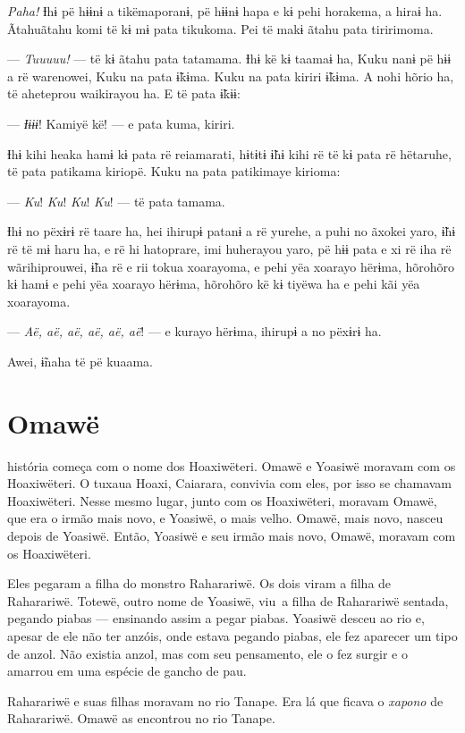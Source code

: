 \textit{Paha!} Ɨhɨ pë hɨɨnɨ a tikëmaporanɨ, pë hɨɨnɨ hapa e kɨ pehi horakema, a
 hiraɨ ha. Ãtahuãtahu komi të kɨ mɨ pata tikukoma. Pei të makɨ ãtahu pata
 tiririmoma.

--- \textit{Tuuuuu!} --- të kɨ ãtahu pata tatamama. Ɨhɨ kë kɨ taamaɨ ha, Kuku nanɨ
pë hɨɨ a rë warenowei, Kuku na pata ɨ̃kɨma. Kuku na pata kiriri ɨ̃kɨma. A nohi hõrio ha, të aheteprou waikirayou ha. E të pata ɨ̃kɨɨ:

--- \textit{Ɨɨɨɨ}! Kamiyë kë! --- e pata kuma, kiriri. 

Ɨhɨ kihi heaka hamɨ kɨ pata rë reiamarati, hɨtɨtɨ ɨ̃hɨ kihi rë të kɨ pata
rë hëtaruhe, të pata patikama kiriopë. Kuku na pata patikimaye kirioma:

--- \textit{Ku}! \textit{Ku}! \textit{Ku}! \textit{Ku}! --- të pata tamama. 

Ɨhɨ no pëxɨrɨ rë taare ha, hei ihirupɨ patanɨ a rë yurehe, a puhi no
 ãxokei yaro, ɨ̃hɨ rë të mɨ haru ha, e rë hi hatoprare, imi huherayou
 yaro, pë hɨɨ pata e xi rë iha rë wãrihiprouwei, ɨ̃ha rë e rii tokua
 xoarayoma, e pehi yëa xoarayo hërɨma, hõrohõro kɨ hamɨ e pehi yëa
 xoarayo hërɨma, hõrohõro kë kɨ tiyëwa ha e pehi kãi yëa xoarayoma. 

--- \textit{Aë, aë, aë, aë, aë, aë}! --- e kurayo hërɨma, ihirupɨ a no pëxɨrɨ ha. 

Awei, ɨ̃naha të pë kuaama. 

\chapter{Omawë}

 história começa com o nome dos Hoaxiwëteri. Omawë e Yoasiwë moravam
com os Hoaxiwëteri. O tuxaua Hoaxi, Caiarara, convivia com eles, por isso se
chamavam Hoaxiwëteri. Nesse mesmo lugar, junto com os Hoaxiwëteri,
moravam Omawë, que era o irmão mais novo, e Yoasiwë, o mais velho.
Omawë, mais novo, nasceu depois de Yoasiwë. Então, Yoasiwë e seu irmão
mais novo, Omawë, moravam com os Hoaxiwëteri.

Eles pegaram a filha do monstro Raharariwë. Os dois viram a filha de
Raharariwë. Totewë, outro nome de Yoasiwë, viu~a filha de Raharariwë
sentada, pegando piabas --- ensinando assim a pegar piabas. Yoasiwë
desceu ao rio e, apesar de ele não ter anzóis, onde estava pegando
piabas, ele fez aparecer um tipo de anzol. Não existia anzol, mas com
seu pensamento, ele o fez surgir e o amarrou em uma espécie de gancho de pau.

Raharariwë e suas filhas moravam no rio Tanape. Era lá que ficava o
 \textit{xapono} de Raharariwë. Omawë as encontrou no rio Tanape.

